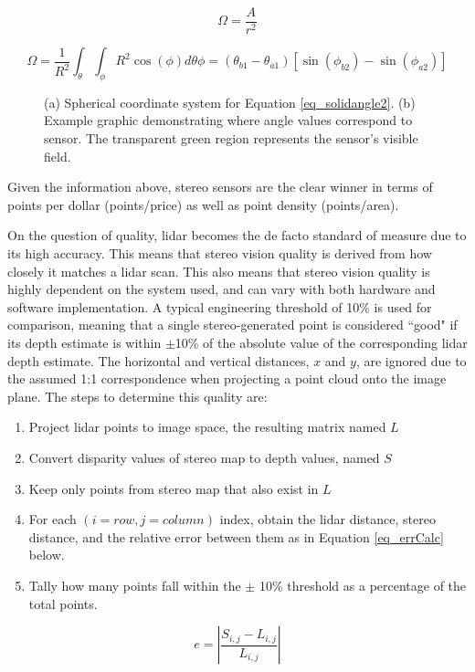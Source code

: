 \begin{equation}
\Omega = \frac{A}{r^2}
\label{eq_solidangle1}
\end{equation}

\begin{equation}
\Omega =
\frac{1}{R^2} \int_{\theta} \int_{\phi} R^2\cos(\phi) d\theta \phi =
(\theta_{b1} - \theta_{a1})[\sin(\phi_{b2}) - \sin(\phi_{a2})]
\label{eq_solidangle2}
\end{equation}

\begin{figure}[ht]
    \centering
    \caption{(a) Spherical coordinate system for Equation \ref{eq_solidangle2}. (b) Example graphic demonstrating where angle values correspond to sensor. The transparent green region represents the sensor's visible field.}
    \label{solidangle}
\end{figure}

Given the information above, stereo sensors are the clear winner in terms of points per dollar (points/price) as well as point density (points/area).

On the question of quality, lidar becomes the de facto standard of measure due to its high accuracy.
This means that stereo vision quality is derived from how closely it matches a lidar scan. This also means that stereo vision quality is highly dependent on the system used, and can vary with both hardware and software implementation. A typical engineering threshold of 10\% is used for comparison, meaning that a single stereo-generated point is considered ``good" if its depth estimate is within $\pm$10\% of the absolute value of the corresponding lidar depth estimate. The horizontal and vertical distances, $x$ and $y$, are ignored due to the assumed 1:1 correspondence when projecting a point cloud onto the image plane. The steps to determine this quality are:

\begin{enumerate} \itemsep=-0.5em
    \item Project lidar points to image space, the resulting matrix named $L$
    \item Convert disparity values of stereo map to depth values, named $S$
    \item Keep only points from stereo map that also exist in $L$
    \item For each $(i=row,j=column)$ index, obtain the lidar distance, stereo distance, and the relative error between them as in Equation \ref{eq_errCalc} below.
    \item Tally how many points fall within the $\pm$ 10\% threshold as a percentage of the total points.
\end{enumerate}
\begin{equation}
    e = \left | \frac{S_{i,j} - L_{i,j}}{L_{i,j}} \right |
    \label{eq_errCalc}
\end{equation}

